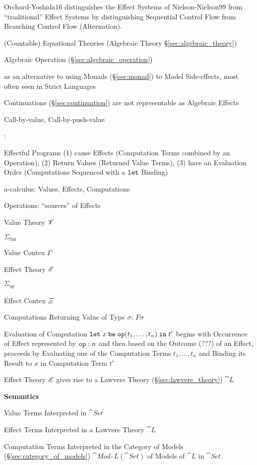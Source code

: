 \fist Orchard-Yoshida16 \cite{orchard-yoshida16} distinguishes the
Effect Systems of Nielson-Nielson99 \cite{nielson-nielson99} from
``traditional'' Effect Systems by distinguishing Sequential Control
Flow from Branching Control Flow (Alternation).


(Countable) Equational Theories (Algebraic Theory
\S\ref{sec:algebraic_theory})

Algebraic Operation (\S\ref{sec:algebraic_operation})


as an alternative to using Monads (\S\ref{sec:monad}) to Model
Side-effects, most often seen in Strict Languages

Continuations (\S\ref{sec:continuation}) are not representable as
Algebraic Effects


Call-by-value, Call-by-push-value %


\cite{plotkin-pretnar08}:

Effectful Programs (1) cause Effects (Computation Terms combined by an
Operation), (2) Return Values (Returned Value Terms), (3) have an
Evaluation Order (Computations Sequenced with a $\mathtt{let}$ Binding)

$a$-calculus: Values, Effects, Computations

Operations: ``sources'' of Effects

Value Theory $\mathscr{V}$

$\Sigma_{\mathrm{fun}}$

Value Contex $\Gamma$

Effect Theory $\mathscr{E}$

$\Sigma_{\mathrm{op}}$

Effect Contex $\Xi$

Computations Returning Value of Type $\sigma$: $F \sigma$

Evaluation of Computation $\mathtt{let}\; x \;\mathtt{be}\; \mathtt{op}(t_1,
\ldots, t_n) \;\mathtt{in}\; t'$ begins with Occurrence of Effect
represented by $\mathtt{op}:n$ and then based on the Outcome (???) of an
Effect, proceeds by Evaluating one of the Computation Terms $t_1,
\ldots, t_n$ and Binding its Result to $x$ in Computation Term $t'$

Effect Theory $\mathscr{E}$ gives rise to a Lawvere Theory
(\S\ref{sec:lawvere_theory}) $\cat{L}$

\textbf{Semantics}

Value Terms Interpreted in $\cat{Set}$

Effect Terms Interpreted in a Lawvere Theory $\cat{L}$

Computation Terms Interpreted in the Category of Models
(\S\ref{sec:category_of_models}) $\cat{Mod}_\cat{L}(\cat{Set})$ of
Models of $\cat{L}$ in $\cat{Set}$.



